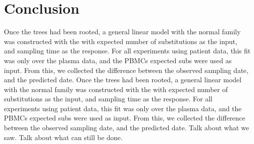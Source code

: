 \section{Conclusion} \label{sec:conclusion}
Once the trees had been rooted, a general linear model with the normal family was constructed with the with expected number of substitutions as the input, and sampling time as the response. 
For all experiments using patient data, this fit was only over the plasma data, and the PBMCs expected subs were used as input. 
From this, we collected the difference between the observed sampling date, and the predicted date. 
Once the trees had been rooted, a general linear model with the normal family was constructed with the with expected number of substitutions as the input, and sampling time as the response. 
For all experiments using patient data, this fit was only over the plasma data, and the PBMCs expected subs were used as input. 
From this, we collected the difference between the observed sampling date, and the predicted date. 
Talk about what we saw.
Talk about what can still be done.

